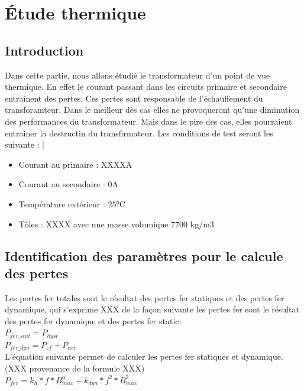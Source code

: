  
\section{Étude thermique}

\subsection{Introduction}

	Dans cette partie, nous allons étudié le transformateur d'un point de vue thermique. En effet le courant passant dans les circuits primaire et secondaire entraînent des pertes. Ces pertes sont responsable de l'échauffement du transforamteur. Dans le meilleur dès cas elles ne provoqueront qu'une diminution des performances du transformateur. Mais dans le pire des cas, elles pourraient entrainer la destructin du transfirmateur. 
	Les conditions de test seront les suivante : 
|\begin{itemize}
\item Courant au primaire : XXXXA
\item Courant au secondaire  : 0A
\item Température extérieur :  25°C
\item Tôles : XXXX avec une masse volumique 7700 kg/m3
\end{itemize}


\subsection{Identification des paramètres pour le calcule  des pertes}


Les pertes fer totales sont le résultat des pertes fer statiques et des pertes fer dynamique, qui s'exprime XXX de la façon suivante les pertes fer sont le résultat des pertes fer dynamique et des pertes fer static: \\
		$ P_{fer\_stat} = P_{hyst}$\\
		$ P_{fer\_dyn} = P_{cf} + P_{exc}$\\

L'équation suivante permet de calculer les pertes fer statiques et dynamique. (XXX provenance de la formule XXX)\\
$ P_{fer} = k_h*f*B_{max}^{\alpha} + k_{dyn}*f^2*B_{max}^2$\\
  


